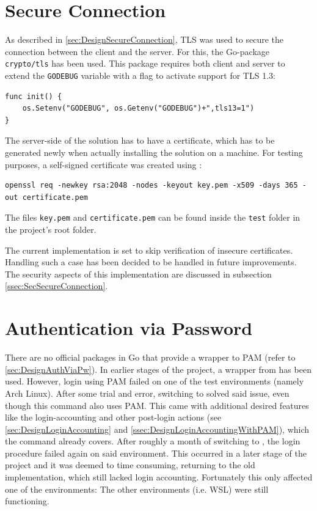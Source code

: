 \documentclass[10pt,a4paper,titlepage,twoside,english,final]{zhawreprt}
\begin{document}
\section{Secure Connection}\label{sec:ImplSecureConnection}
As described in \ref{sec:DesignSecureConnection}, \gls{TLS} was used to secure the connection between the client and the server.
For this, the \gls{Go}-package \texttt{crypto/tls} has been used.
This package requires both client and server to extend the \texttt{GODEBUG} variable with a flag to activate support for \gls{TLS} 1.3:
\setlistingGo
\begin{lstlisting}[caption={Activating \gls{TLS} 1.3 in \gls{Go}},label=lst:TlsInGo]
func init() {
    os.Setenv("GODEBUG", os.Getenv("GODEBUG")+",tls13=1")
}
\end{lstlisting}
The server-side of the solution has to have a certificate, which has to be generated newly when actually installing the solution on a machine.
For testing purposes, a self-signed certificate was created using \cite{openssl}:
\setlistingBash
\begin{lstlisting}[caption={Generating a self-signed certificate and private key},label=lst:GenCertNKey]
openssl req -newkey rsa:2048 -nodes -keyout key.pem -x509 -days 365 -out certificate.pem
\end{lstlisting}
The files \texttt{key.pem} and \texttt{certificate.pem} can be found inside the \texttt{test} folder in the project's root folder.

The current implementation is set to skip verification of insecure certificates.
Handling such a case has been decided to be handled in future improvements.
The security aspects of this implementation are discussed in subsection \ref{ssec:SecSecureConnection}.

\section{Authentication via Password}\label{sec:ImplAuthViaPw}
There are no official packages in \gls{Go} that provide a wrapper to \gls{PAM} (refer to \ref{sec:DesignAuthViaPw}).
In earlier stages of the project, a wrapper from \cite{gopam} has been used.
However, \gls{login} using \gls{PAM} failed on one of the test environments (namely Arch \gls{Linux}).
After some trial and error, switching to \cite{login} solved said issue, even though this command also uses \gls{PAM}.
This came with additional desired features like the \gls{login}-accounting and other post-\gls{login} actions (see \ref{sec:DesignLoginAccounting} and \ref{ssec:DesignLoginAccountingWithPAM}), which the command already covers.
After roughly a month of switching to \cite{login}, the \gls{login} procedure failed again on said environment.
This occurred in a later stage of the project and it was deemed to time consuming, returning to the old implementation, which still lacked \gls{login} accounting.
Fortunately this only affected one of the environments:
The other environments (i.e. \gls{WSL}) were still functioning.
\end{document}
